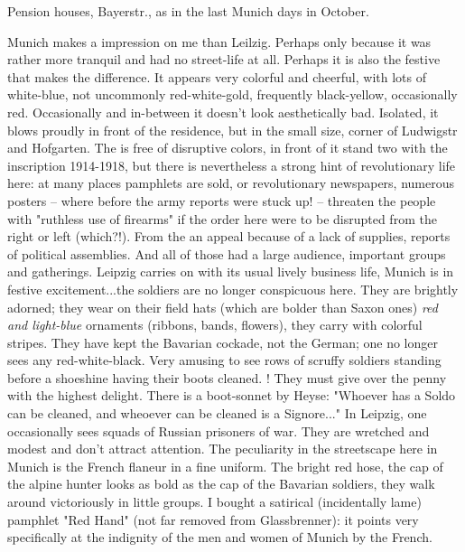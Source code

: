 
Pension houses, Bayerstr., as in the last Munich days in October.

Munich makes a  impression on me than Leilzig. Perhaps only because it was rather more tranquil and had no street-life at all. Perhaps it is also the festive  that makes the difference. It appears very colorful and cheerful, with lots of white-blue, not uncommonly red-white-gold, frequently black-yellow, occasionally red. Occasionally and in-between it doesn't look aesthetically bad. Isolated, it blows proudly in front of the residence, but in the small size, corner of Ludwigstr and Hofgarten. The  is free of disruptive colors, in front of it stand two  with the inscription 1914-1918, but there is nevertheless a strong hint of revolutionary life here: at many places pamphlets are sold, or revolutionary newspapers, numerous posters -- where before the army reports were stuck up! -- threaten the people with "ruthless use of firearms" if the order here were to be disrupted from the right or left (which?!). From the  an appeal  because of a lack of supplies, reports of political assemblies. And all of those had a large audience, important groups and gatherings. Leipzig carries on with its usual lively business life, Munich is in festive excitement...the soldiers are no longer conspicuous here. They are brightly adorned; they wear on their field hats (which are bolder than Saxon ones) \textit{red and light-blue} ornaments (ribbons, bands, flowers), they carry  with colorful stripes. They have kept the Bavarian cockade, not the German; one no longer sees any red-white-black. Very amusing to see rows of scruffy soldiers standing before a shoeshine having their boots cleaned. ! They must give over the penny with the highest delight. There is a boot-sonnet by Heyse: "Whoever has a Soldo can be cleaned, and wheoever can be cleaned is a Signore..." In Leipzig, one occasionally sees squads of Russian prisoners of war. They are wretched and modest and don't attract attention. The peculiarity in the streetscape here in Munich is the French flaneur in a fine uniform. The bright red hose, the cap of the alpine hunter looks as bold as the cap of the Bavarian soldiers, they walk around victoriously in little groups. I bought a satirical (incidentally lame) pamphlet "Red Hand" (not far removed from Glassbrenner): it points very specifically at the indignity of the men and women of Munich by the French.

